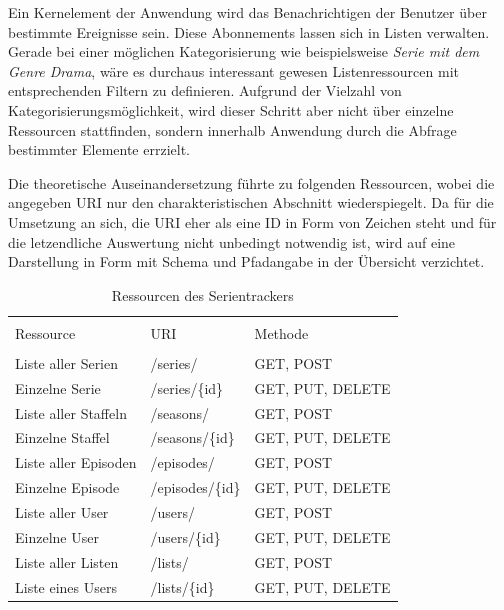 Ein Kernelement der Anwendung wird das Benachrichtigen der Benutzer über bestimmte Ereignisse sein. Diese Abonnements lassen sich in Listen verwalten. Gerade bei einer möglichen Kategorisierung wie beispielsweise \textit{Serie mit dem Genre Drama}, wäre es durchaus interessant gewesen Listenressourcen mit entsprechenden Filtern zu definieren. Aufgrund der Vielzahl von Kategorisierungsmöglichkeit, wird dieser Schritt aber nicht über einzelne Ressourcen stattfinden, sondern innerhalb Anwendung durch die Abfrage bestimmter Elemente errzielt.
\newpage

Die theoretische Auseinandersetzung führte zu folgenden Ressourcen, wobei die angegeben URI nur den charakteristischen Abschnitt wiederspiegelt.
Da für die Umsetzung an sich, die URI eher als eine ID in Form von Zeichen steht und für die letzendliche Auswertung nicht unbedingt notwendig ist, wird auf eine Darstellung in Form mit Schema und Pfadangabe in der Übersicht verzichtet.

\begin{table}[H]
\caption{Ressourcen des Serientrackers}

\centering
\begin{tabular}{l l l}
\\ [-0.5ex]

\hline\hline
\\ [-0.5ex]
Ressource & URI & Methode
\\ [1.5ex]
\hline
\\ [-0.5ex]
Liste aller Serien & /series/ & GET, POST \\[1ex]
Einzelne Serie & /series/\{id\} & GET, PUT, DELETE\\[1ex]
Liste aller Staffeln & /seasons/ & GET, POST \\[1ex]
Einzelne Staffel & /seasons/\{id\} & GET, PUT, DELETE\\[1ex]
Liste aller Episoden & /episodes/ & GET, POST \\[1ex]
Einzelne Episode & /episodes/\{id\} & GET, PUT, DELETE\\[1ex]
Liste aller User & /users/ & GET, POST \\[1ex]
Einzelne User & /users/\{id\} & GET, PUT, DELETE\\[1ex]
Liste aller Listen & /lists/ & GET, POST\\[1ex]
Liste eines Users & /lists/\{id\} & GET, PUT, DELETE\\[1ex]
\hline
\end{tabular}
\label{tab:ressourcendesserientrackers}
\end{table}

